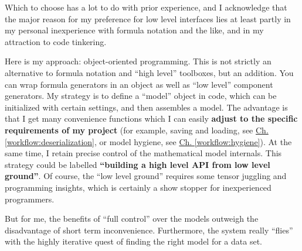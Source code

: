 Which to choose has a lot to do with prior experience, and I acknowledge that the major reason for my preference for low level interfaces lies at least partly in my personal inexperience with formula notation and the like, and in my attraction to code tinkering.


Here is my approach: object-oriented programming.
This is not strictly an alternative to formula notation and ``high level'' toolboxes, but an addition.
You can wrap formula generators in an object as well as ``low level'' component generators.
My strategy is to define a ``model'' object in code, which can be initialized with certain settings, and then assembles a model.
The advantage is that I get many convenience functions which I can easily \textbf{adjust to the specific requirements of my project} (for example, saving and loading, see \hyperref[workflow:deserialization]{Ch. \ref{workflow:deserialization}}, or model hygiene, see \hyperref[workflow:hygiene]{Ch. \ref{workflow:hygiene}}).
At the same time, I retain precise control of the mathematical model internals.
This strategy could be labelled \textbf{``building a high level API from low level ground''}.
Of course, the ``low level ground'' requires some tensor juggling and programming insights, which is certainly a show stopper for inexperienced programmers.

But for me, the benefits of ``full control'' over the models outweigh the disadvantage of short term inconvenience.
Furthermore, the system really ``flies'' with the highly iterative quest of finding the right model for a data set.


